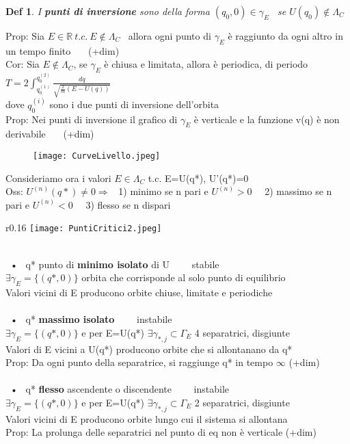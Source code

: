 \documentclass{article}
\theoremstyle{unnumbered}
\newtheorem* {theoremT}{Def}
\theoremstyle{unnumbered1}
\newenvironment{defi}{\begin{gBox}\begin{theoremT}}{\end{theoremT}\end{gBox}}
\begin{document}
%
%
%
\begin{defi}
I \textbf{punti di inversione} sono della forma $(q_0,0)\in\gamma_E$ \ se $U(q_0)\not\in \Lambda_C$
\end{defi}
%
Prop: Sia $E\in\mathbb{R} \ t.c. \ E \not\in\Lambda_C$ \ allora ogni punto di $\gamma_E$ è raggiunto da ogni altro in un tempo finito \ \ \ (+dim)\\
Cor: Sia $E \not\in\Lambda_C$, se $\gamma_E$ è chiusa e limitata, allora è periodica, di periodo \ $T=2\int_{q_0^{(1)}}^{q_0^{(2)}}\frac{dq}{\sqrt{\frac{2}{m}(E-U(q))}}$ \\ 
\phantom{Cor: }dove ${q_0^{(i)}}$ sono i due punti di inversione dell'orbita \\
Prop: Nei punti di inversione il grafico di $\gamma_E$ è verticale e la funzione v(q) è non derivabile \ \ \ (+dim)
%
%
%
\begin{figure}[h!]
\begin{center}
  \texttt{[image: CurveLivello.jpeg]}\\
\end{center}
\end{figure}\newpage
%
%
%
Consideriamo ora i valori $E\in\Lambda_C$ t.c. E=U(q*), U'(q*)=0 \\
Oss: $U^{(n)}(q*)\neq 0 \Rightarrow$ \ 1) minimo se n pari e  $U^{(n)} > 0$ \ \ 2) massimo se n pari e $U^{(n)} < 0$ \ \ 3) flesso se n dispari 
%
%
%
\begin{wrapfigure}{r}{0.16\textwidth}
\texttt{[image: PuntiCritici2.jpeg]}
\end{wrapfigure}\\
%
%
\ • \ q* punto di \textbf{minimo isolato} di U \ \ \ \ stabile\\
\phantom{\ • }$\exists \gamma_E=\{(q*,0)\}$ orbita che corrisponde al solo punto di equilibrio\\
\phantom{\ • }Valori vicini di E producono orbite chiuse, limitate e periodiche \\ \\
%
%
\ • \ q* \textbf{massimo isolato} \ \ \ \ instabile\\
\phantom{\ • }$\exists \gamma_E=\{(q*,0)\}$ e per E=U(q*) $\exists\gamma_{*,j}\subset\Gamma_E$ 4 separatrici, disgiunte\\
\phantom{\ • }Valori di E vicini a U(q*) producono orbite che si allontanano da q*\\
Prop: Da ogni punto della separatrice, si raggiunge q* in tempo $\infty$ (+dim)\\ \\
%
\ • \ q* \textbf{flesso} ascendente o discendente \ \ \ \ instabile\\
\phantom{\ • }$\exists \gamma_E=\{(q*,0)\}$ e  per E=U(q*) $\exists \gamma_{*,j}\subset\Gamma_E$ 2 separatrici, disgiunte\\
\phantom{\ • }Valori vicini di E producono orbite lungo cui il sistema si allontana\\
Prop: La prolunga delle separatrici nel punto di eq non è verticale (+dim)\\
\end{document}
